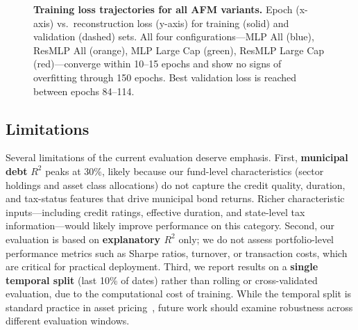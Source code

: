 \begin{figure}[t]
\centering
\fbox{\rule{0pt}{2in}\rule{0.9\linewidth}{0pt}} %
\caption{\textbf{Training loss trajectories for all AFM variants.} Epoch (x-axis) vs.\ reconstruction loss (y-axis) for training (solid) and validation (dashed) sets. All four configurations---MLP All (blue), ResMLP All (orange), MLP Large Cap (green), ResMLP Large Cap (red)---converge within 10--15 epochs and show no signs of overfitting through 150 epochs. Best validation loss is reached between epochs 84--114.}
\label{fig:training_loss}
\end{figure}

\subsection{Limitations}\label{sec:limitations}

Several limitations of the current evaluation deserve emphasis. First, \textbf{municipal debt} $R^2$ peaks at 30\%, likely because our fund-level characteristics (sector holdings and asset class allocations) do not capture the credit quality, duration, and tax-status features that drive municipal bond returns. Richer characteristic inputs---including credit ratings, effective duration, and state-level tax information---would likely improve performance on this category. Second, our evaluation is based on \textbf{explanatory $R^2$} only; we do not assess portfolio-level performance metrics such as Sharpe ratios, turnover, or transaction costs, which are critical for practical deployment. Third, we report results on a \textbf{single temporal split} (last 10\% of dates) rather than rolling or cross-validated evaluation, due to the computational cost of training. While the temporal split is standard practice in asset pricing~\citep{GuKellyXiu2020empirical, GuKellyXiu2021autoencoder}, future work should examine robustness across different evaluation windows.
